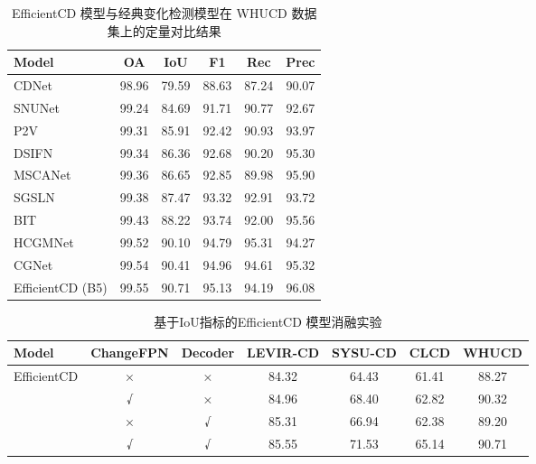 \begin{table}[!htbp]
  \centering
  \caption{EfficientCD 模型与经典变化检测模型在 WHUCD 数据集上的定量对比结果}
  \label{tab:efficientcd_whucd}
  \begin{tabular}{lccccc}
    \toprule
    Model            &   OA   &  IoU   &   F1   &   Rec   &  Prec   \\
    \midrule
    CDNet~\cite{Alcantarilla2016StreetviewCD}            &  98.96 &  79.59 &  88.63 &  87.24  &  90.07  \\
    SNUNet~\cite{Fang2021SNUNetCDAD}           &  99.24 &  84.69 &  91.71 &  90.77  &  92.67  \\
    P2V~\cite{lin_transition_2023}              &  99.31 &  85.91 &  92.42 &  90.93  &  93.97  \\
    DSIFN~\cite{Zhang2020ADS}            &  99.34 &  86.36 &  92.68 &  90.20  &  95.30  \\
    MSCANet~\cite{m_liu_cnn-transformer_2022}          &  99.36 &  86.65 &  92.85 &  89.98  &  95.90  \\
    SGSLN~\cite{zhao_exchanging_2023}            &  99.38 &  87.47 &  93.32 &  92.91  &  93.72  \\
    BIT~\cite{chen_remote_2022}              &  99.43 &  88.22 &  93.74 &  92.00  &  95.56  \\
    HCGMNet~\cite{Han2023HCGMNetAH}          &  99.52 &  90.10 &  94.79 &  95.31  &  94.27  \\
    CGNet~\cite{han_change_2023}            &  99.54 &  90.41 &  94.96 &  94.61  &  95.32  \\
    EfficientCD (B5) &  99.55 &  90.71 &  95.13 &  94.19  &  96.08  \\
    \bottomrule
  \end{tabular}
\end{table}

\begin{table}[!htbp]
  \centering
  \setlength{\tabcolsep}{3pt} %
  \caption{基于IoU指标的EfficientCD 模型消融实验}
  \label{tab:efficientcd_ablation}
  \begin{tabular}{lcccccc}
    \toprule
    Model         & ChangeFPN & Decoder & LEVIR-CD & SYSU-CD & CLCD   & WHUCD  \\
    \midrule
    EfficientCD   & ×         & ×       & 84.32    & 64.43   & 61.41  & 88.27  \\
                  & √         & ×       & 84.96    & 68.40   & 62.82  & 90.32  \\
                  & ×         & √       & 85.31    & 66.94   & 62.38  & 89.20  \\
                  & √         & √       & 85.55    & 71.53   & 65.14  & 90.71  \\
    \bottomrule
  \end{tabular}
\end{table}

